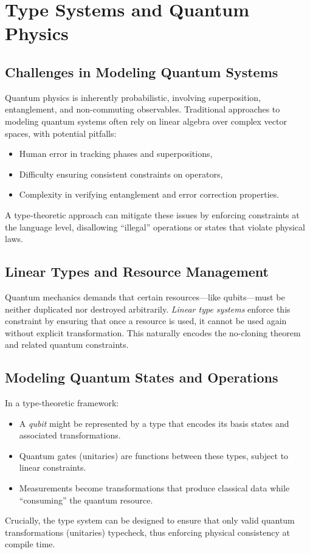 \documentclass[12pt]{article}
\begin{document}
\section{Type Systems and Quantum Physics}
\label{sec:quantum_type_systems}

\subsection{Challenges in Modeling Quantum Systems}
Quantum physics is inherently probabilistic, involving superposition, entanglement, and non-commuting observables. Traditional approaches to modeling quantum systems often rely on linear algebra over complex vector spaces, with potential pitfalls:
\begin{itemize}[label=$\bullet$]
    \item Human error in tracking phases and superpositions,
    \item Difficulty ensuring consistent constraints on operators,
    \item Complexity in verifying entanglement and error correction properties.
\end{itemize}
A type‐theoretic approach can mitigate these issues by enforcing constraints at the language level, disallowing “illegal” operations or states that violate physical laws.

\subsection{Linear Types and Resource Management}
Quantum mechanics demands that certain resources—like qubits—must be neither duplicated nor destroyed arbitrarily. \emph{Linear type systems} enforce this constraint by ensuring that once a resource is used, it cannot be used again without explicit transformation. This naturally encodes the no-cloning theorem and related quantum constraints.

\subsection{Modeling Quantum States and Operations}
In a type-theoretic framework:
\begin{itemize}[label=$\bullet$]
    \item A \emph{qubit} might be represented by a type that encodes its basis states and associated transformations.
    \item Quantum gates (unitaries) are functions between these types, subject to linear constraints.
    \item Measurements become transformations that produce classical data while “consuming” the quantum resource.
\end{itemize}
Crucially, the type system can be designed to ensure that only valid quantum transformations (unitaries) typecheck, thus enforcing physical consistency at compile time.
\end{document}
